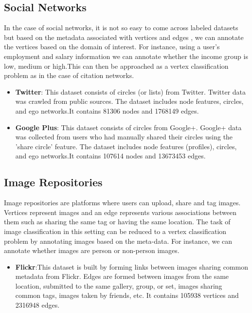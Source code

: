 \documentclass{article}
\begin{document}
\subsection*{Social Networks}
In the case of social networks, it is not so easy to come across labeled datasets but based on the metadata associated with vertices and edges , we can annotate the vertices based on the domain of interest. For instance, using a user's employment and salary information we can annotate whether the income group is low, medium or high.This can then be approached as a vertex classification problem as in the case of citation networks. 
\begin{itemize}
\item \textbf{Twitter}: This dataset consists of circles (or lists) from Twitter. Twitter data was crawled from public sources. The dataset includes node features, circles, and ego networks.It contains 81306 nodes and 1768149 edges.
\item \textbf{Google Plus}: This dataset consists of circles from Google+. Google+ data was collected from users who had manually shared their circles using the 'share circle' feature. The dataset includes node features (profiles), circles, and ego networks.It contains 107614 nodes and 13673453 edges.
\end{itemize}

\subsection*{Image Repositories}
Image repositories are platforms where users can upload, share and tag images. Vertices represent images and an edge represents various associations between them such as sharing the same tag or having the same location. The task of image classification in this setting can be reduced to a vertex classification problem by annotating images based on the meta-data. For instance, we can annotate whether images are person or non-person images. 
\begin{itemize}
\item \textbf{Flickr}:This dataset is built by forming links between images sharing common metadata from Flickr. Edges are formed between images from the same location, submitted to the same gallery, group, or set, images sharing common tags, images taken by friends, etc.
It contains 105938 vertices and 2316948 edges.
\end{itemize}  
\end{document}
